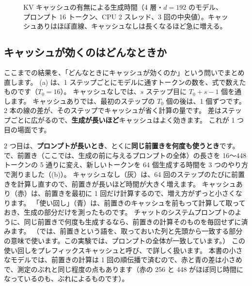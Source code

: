 \begin{figure}[tbp]
\centering
{}
\caption{KV キャッシュの有無による生成時間（4 層・$d=192$ のモデル、プロンプト 16 トークン、CPU 2 スレッド、3 回の中央値）。キャッシュありはほぼ直線、キャッシュなしは長くなるほど急に増える。}
\label{fig:ma-kv-speed}
\end{figure}

\subsection*{キャッシュが効くのはどんなときか}

ここまでの結果を、「どんなときにキャッシュが効くのか」という問いでまとめ直します。
(a) は、1 ステップごとにモデルに通すトークンの数を、式で数えたものです（$T_0=16$）。
キャッシュなしでは、$s$ ステップ目に $T_0+s-1$ 個を通します。
キャッシュありでは、最初のステップの $T_0$ 個の後は、1 個ずつです。
2 本の線の差が、そのステップでキャッシュが省く計算の量です。
差はステップごとに広がるので、\textbf{生成が長いほど}キャッシュはよく効きます。
これが 1 つ目の場面です。

2 つ目は、\textbf{プロンプトが長いとき}、とくに\textbf{同じ前置きを何度も使うとき}です。
 で、前置き（ここでは、生成の前に与えるプロンプトの全体）の長さを 16〜448 トークンの 5 通りに変え、新しいトークンを 64 個生成する時間を 3 つのやり方で測りました（(b)）。
キャッシュなし（灰）は、64 回のステップのたびに前置きを計算し直すので、前置きが長いほど時間が大きく増えます。
キャッシュあり（赤）は、前置きを最初に 1 回だけ計算するので、増え方がずっと小さくなります。
「使い回し」（青）は、前置きのキャッシュを前もって計算して取っておき、生成の部分だけを測ったものです。
チャットのシステムプロンプトのように、同じ前置きで何度も生成するなら、前置きの計算そのものを毎回せずに済みます。
（では、前置きという語を、取っておいた列と先頭から一致する部分の意味で使います。この実験では、プロンプトの全体が一致しています。）
この使い回しをプレフィックスキャッシュと呼び、で詳しく扱います。
本書の小さなモデルでは、前置きの計算は 1 回の順伝播で済むので、赤と青の差は小さめで、測定のぶれと同じ程度の点もあります（赤の 256 と 448 がほぼ同じ時間になっているのも、ぶれによるものです）。

